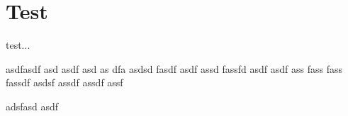 \documentclass{article}
\begin{document}


\section{Test}

test...

\hangindent=0.7cm asdfasdf asd asdf asd as dfa asdsd fasdf asdf assd fassfd asdf asdf ass fass fass fassdf asdsf assdf assdf assf 

adsfasd asdf 
\end{document}
